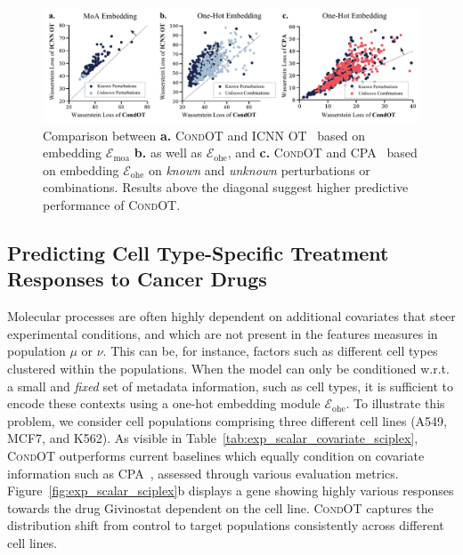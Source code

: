 \begin{figure}[t]
    \includegraphics[width=\textwidth]{figures/fig_action_comb_comparison_scatter.pdf}
    \caption{Comparison between \textbf{a.} \textsc{CondOT} and \textsc{ICNN OT}~\citep{makkuva2020optimal} based on embedding $\mathcal{E}_\text{moa}$ \textbf{b.} as well as $\mathcal{E}_\text{ohe}$, and \textbf{c.} \textsc{CondOT} and \textsc{CPA}~\citep{lotfollahi2021compositional} based on embedding $\mathcal{E}_\text{ohe}$ on \emph{known} and \emph{unknown} perturbations or combinations. Results above the diagonal suggest higher predictive performance of \textsc{CondOT}.}
    \label{fig:exp_action_norman_scatter}
\end{figure}


\subsection{Predicting Cell Type-Specific Treatment Responses to Cancer Drugs} \label{sec:eval_covariate}

 Molecular processes are often highly dependent on additional covariates that steer experimental conditions, and which are not present in the features measures in population $\mu$ or $\nu$.
This can be, for instance, factors such as different cell types clustered within the populations.
When the model can only be conditioned w.r.t. a small and \textit{fixed} set of metadata information, such as cell types, it is sufficient to encode these contexts using a one-hot embedding module $\mathcal{E}_\text{ohe}$.
To illustrate this problem, we consider cell populations comprising three different cell lines (A549, MCF7, and K562). As visible in Table~\ref{tab:exp_scalar_covariate_sciplex}, \textsc{CondOT} outperforms current baselines which equally condition on covariate information such as \textsc{CPA}~\citep{lotfollahi2021compositional}, assessed through various evaluation metrics.
Figure~\ref{fig:exp_scalar_sciplex}b displays a gene showing highly various responses towards the drug Givinostat dependent on the cell line. \textsc{CondOT} captures the distribution shift from control to target populations consistently across different cell lines.


